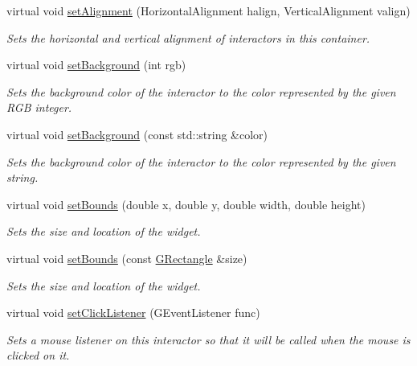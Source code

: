 \begin{DoxyCompactItemize}
virtual void \mbox{\hyperlink{classGContainer_a0bcf8805d87afc9bb4c6ca238ca7c0bd}{set\+Alignment}} (Horizontal\+Alignment halign, Vertical\+Alignment valign)
\begin{DoxyCompactList}\small\item\em Sets the horizontal and vertical alignment of interactors in this container. \end{DoxyCompactList}\item 
virtual void \mbox{\hyperlink{classGInteractor_acba7e546c2025c0a15ca4b4cc92043db}{set\+Background}} (int rgb)
\begin{DoxyCompactList}\small\item\em Sets the background color of the interactor to the color represented by the given R\+GB integer. \end{DoxyCompactList}\item 
virtual void \mbox{\hyperlink{classGInteractor_ab4677ab2474e68b07aa56605af92a84a}{set\+Background}} (const std\+::string \&color)
\begin{DoxyCompactList}\small\item\em Sets the background color of the interactor to the color represented by the given string. \end{DoxyCompactList}\item 
virtual void \mbox{\hyperlink{classGInteractor_a2aae8197624b72265ab83b4f1bc73f2f}{set\+Bounds}} (double x, double y, double width, double height)
\begin{DoxyCompactList}\small\item\em Sets the size and location of the widget. \end{DoxyCompactList}\item 
virtual void \mbox{\hyperlink{classGInteractor_acada386653f008cacc7cce86426bef7c}{set\+Bounds}} (const \mbox{\hyperlink{structGRectangle}{G\+Rectangle}} \&size)
\begin{DoxyCompactList}\small\item\em Sets the size and location of the widget. \end{DoxyCompactList}\item 
virtual void \mbox{\hyperlink{classGInteractor_abd40af6921242584d0954f173911b190}{set\+Click\+Listener}} (G\+Event\+Listener func)
\begin{DoxyCompactList}\small\item\em Sets a mouse listener on this interactor so that it will be called when the mouse is clicked on it. \end{DoxyCompactList}\item 

\end{DoxyCompactItemize}
